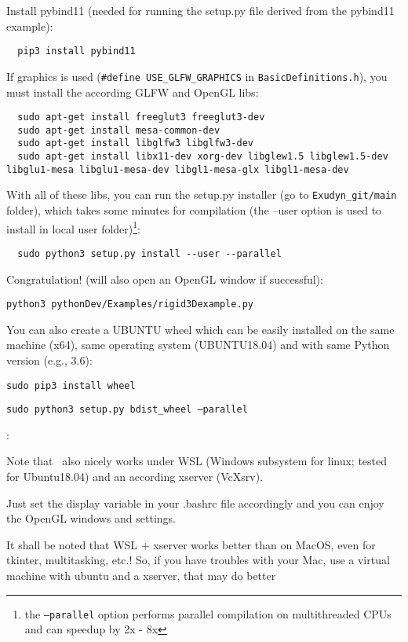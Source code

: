 \noindent Install pybind11 (needed for running the setup.py file derived from the pybind11 example):
\begin{lstlisting}
  pip3 install pybind11
\end{lstlisting}

\noindent 
If graphics is used (\texttt{\#define USE\_GLFW\_GRAPHICS} in \texttt{BasicDefinitions.h}), you must install the according GLFW and OpenGL libs:
\begin{lstlisting}
  sudo apt-get install freeglut3 freeglut3-dev
  sudo apt-get install mesa-common-dev
  sudo apt-get install libglfw3 libglfw3-dev
  sudo apt-get install libx11-dev xorg-dev libglew1.5 libglew1.5-dev libglu1-mesa libglu1-mesa-dev libgl1-mesa-glx libgl1-mesa-dev
\end{lstlisting}

\noindent 
With all of these libs, you can run the setup.py installer (go to \texttt{Exudyn\_git/main} folder), which takes some minutes for compilation (the --user option is used to install in local user folder)\footnote{the \texttt{--parallel} option performs parallel compilation on multithreaded CPUs and can speedup by 2x - 8x}:
\begin{lstlisting}
  sudo python3 setup.py install --user --parallel
\end{lstlisting}

\noindent 
Congratulation!  (will also open an OpenGL window if successful):
\bi
  \item[] \texttt{python3 pythonDev/Examples/rigid3Dexample.py}
\ei

\noindent You can also create a UBUNTU wheel which can be easily installed on the same machine (x64), same operating system (UBUNTU18.04) and with same Python version (e.g., 3.6):
\bi
  \item[] \texttt{sudo pip3 install wheel}
  \item[] \texttt{sudo python3 setup.py bdist\_wheel --parallel}
\ei

\noindent {}:
\bi
  \item Note that \codeName\ also nicely works under WSL (Windows subsystem for linux; tested for Ubuntu18.04) and an according xserver (VcXsrv).
  \item Just set the display variable in your .bashrc file accordingly and you can enjoy the OpenGL windows and settings.
  \item It shall be noted that WSL + xserver works better than on MacOS, even for tkinter, multitasking, etc.! So, if you have troubles with your Mac, use a virtual machine with ubuntu and a xserver, that may do better
\ei

